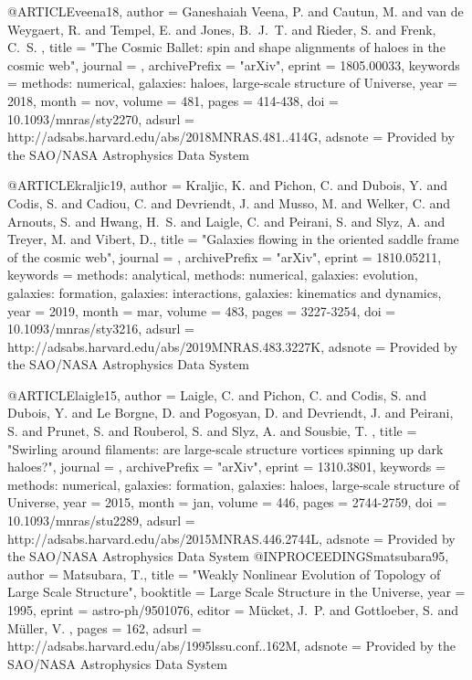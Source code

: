 \documentclass{aa}
\begin{document}
{@ARTICLE{veena18,
   author = {{Ganeshaiah Veena}, P. and {Cautun}, M. and {van de Weygaert}, R. and 
	{Tempel}, E. and {Jones}, B.~J.~T. and {Rieder}, S. and {Frenk}, C.~S.
	},
    title = "{The Cosmic Ballet: spin and shape alignments of haloes in the cosmic web}",
  journal = {\mnras},
archivePrefix = "arXiv",
   eprint = {1805.00033},
 keywords = {methods: numerical, galaxies: haloes, large-scale structure of Universe},
     year = 2018,
    month = nov,
   volume = 481,
    pages = {414-438},
      doi = {10.1093/mnras/sty2270},
   adsurl = {http://adsabs.harvard.edu/abs/2018MNRAS.481..414G},
  adsnote = {Provided by the SAO/NASA Astrophysics Data System}
}


@ARTICLE{kraljic19,
   author = {{Kraljic}, K. and {Pichon}, C. and {Dubois}, Y. and {Codis}, S. and 
	{Cadiou}, C. and {Devriendt}, J. and {Musso}, M. and {Welker}, C. and 
	{Arnouts}, S. and {Hwang}, H.~S. and {Laigle}, C. and {Peirani}, S. and 
	{Slyz}, A. and {Treyer}, M. and {Vibert}, D.},
    title = "{Galaxies flowing in the oriented saddle frame of the cosmic web}",
  journal = {\mnras},
archivePrefix = "arXiv",
   eprint = {1810.05211},
 keywords = {methods: analytical, methods: numerical, galaxies: evolution, galaxies: formation, galaxies: interactions, galaxies: kinematics and dynamics},
     year = 2019,
    month = mar,
   volume = 483,
    pages = {3227-3254},
      doi = {10.1093/mnras/sty3216},
   adsurl = {http://adsabs.harvard.edu/abs/2019MNRAS.483.3227K},
  adsnote = {Provided by the SAO/NASA Astrophysics Data System}
}


@ARTICLE{laigle15,
   author = {{Laigle}, C. and {Pichon}, C. and {Codis}, S. and {Dubois}, Y. and 
	{Le Borgne}, D. and {Pogosyan}, D. and {Devriendt}, J. and {Peirani}, S. and 
	{Prunet}, S. and {Rouberol}, S. and {Slyz}, A. and {Sousbie}, T.
	},
    title = "{Swirling around filaments: are large-scale structure vortices spinning up dark haloes?}",
  journal = {\mnras},
archivePrefix = "arXiv",
   eprint = {1310.3801},
 keywords = {methods: numerical, galaxies: formation, galaxies: haloes, large-scale structure of Universe},
     year = 2015,
    month = jan,
   volume = 446,
    pages = {2744-2759},
      doi = {10.1093/mnras/stu2289},
   adsurl = {http://adsabs.harvard.edu/abs/2015MNRAS.446.2744L},
  adsnote = {Provided by the SAO/NASA Astrophysics Data System}
}
@INPROCEEDINGS{matsubara95,
   author = {{Matsubara}, T.},
    title = "{Weakly Nonlinear Evolution of Topology of Large Scale Structure}",
booktitle = {Large Scale Structure in the Universe},
     year = 1995,
   eprint = {astro-ph/9501076},
   editor = {{M{\"u}cket}, J.~P. and {Gottloeber}, S. and {M{\"u}ller}, V.
	},
    pages = {162},
   adsurl = {http://adsabs.harvard.edu/abs/1995lssu.conf..162M},
  adsnote = {Provided by the SAO/NASA Astrophysics Data System}
}


}
\end{document}
